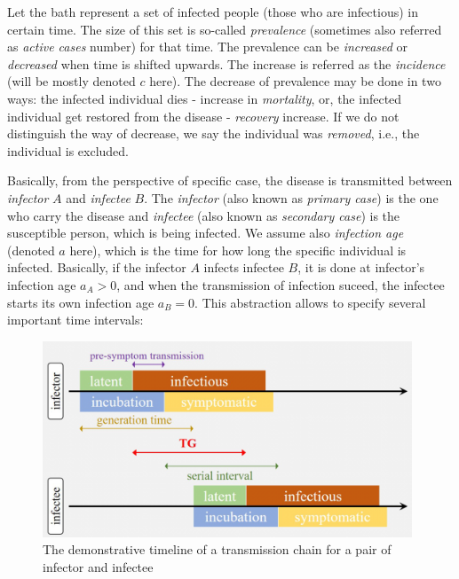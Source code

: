 \documentclass[
  digital, %
  oneside, %
  lof,     %
  lot,     %
]{fithesis4}
\begin{document}
Let the bath represent a
set of infected people (those who are infectious) in certain time.
The size of this set is so-called \textit{prevalence} (sometimes also referred 
as \textit{active cases} number) for that time.
The prevalence can be \textit{increased} or \textit{decreased} when time is shifted upwards.
The increase is referred as the \textit{incidence} (will be mostly denoted $c$ here).
The decrease of prevalence may be done in two ways:
the infected individual dies - increase in \textit{mortality}, or, the
infected individual get restored from the disease - \textit{recovery} increase.
If we do not distinguish the way of decrease, we say the
individual was \textit{removed}, i.e., the individual is excluded.

Basically, from the perspective of specific case, the disease is
transmitted between \textit{infector} $A$ and \textit{infectee} $B$.
The \textit{infector} (also known as \textit{primary case}) is the one who carry the disease and
\textit{infectee} (also known as \textit{secondary case}) is the 
susceptible person, which is being infected.
We assume also \textit{infection age} (denoted $a$ here),
which is the time for how long the specific individual is infected.
Basically, if the infector $A$ infects infectee $B$, it is done at infector's
infection age $a_A > 0$, and when the transmission of infection suceed,
the infectee starts its own infection age $a_B = 0$.
This abstraction allows to specify several important time intervals:

\begin{figure}[H]
  \begin{center}
    \includegraphics[width=11cm]{static/images/zhao2020_terms.png}
  \end{center}
  \caption{The demonstrative timeline of a transmission chain for a pair of infector and infectee \cite{zhao2020}}
  \label{fig:zhao-transmissive-chain-example}
\end{figure}
\end{document}
